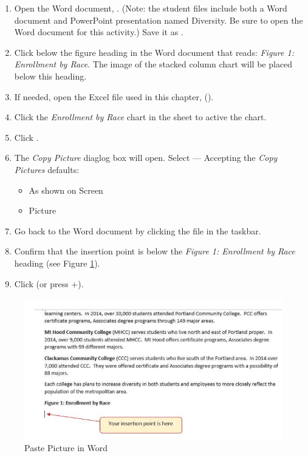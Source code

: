 \begin{enumerate}
	\item Open the Word document, . (Note: the student files include both a Word document and PowerPoint presentation named Diversity. Be sure to open the Word document for this activity.) Save it as .
	\item Click below the figure heading in the Word document that reads: \textit{Figure 1: Enrollment by Race}. The image of the stacked column chart will be placed below this heading.
	\item If needed, open the Excel file used in this chapter,  (). 
	\item Click the \textit{Enrollment by Race} chart in the  sheet to active the chart.
	\item Click .
	\item The \textit{Copy Picture} diaglog box will open. Select  --- Accepting the \textit{Copy Pictures} defaults:
	
	\begin{itemize}
		\item As shown on Screen
		\item Picture
	\end{itemize}	

	\item Go back to the  Word document by clicking the file in the taskbar.
	\item Confirm that the insertion point is below the \textit{Figure 1: Enrollment by Race} heading (see Figure \ref{04:fig46}).
	\item Click  (or press +).
\end{enumerate}

\begin{figure}[H]
	\centering
	\includegraphics[width=\maxwidth{.95\linewidth}]{gfx/ch04_fig46}
	\caption{Paste Picture in Word}
	\label{04:fig46}
\end{figure}

